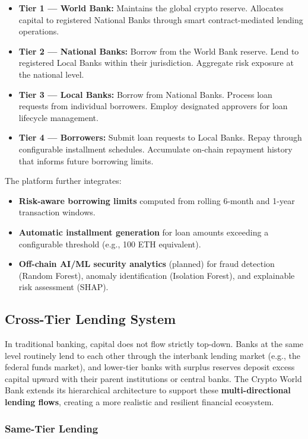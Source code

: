 \documentclass[12pt,a4paper]{report}
\begin{document}
\begin{itemize}[noitemsep]
\item \textbf{Tier 1 --- World Bank:} Maintains the global crypto reserve. Allocates capital to registered National Banks through smart contract-mediated lending operations.
\item \textbf{Tier 2 --- National Banks:} Borrow from the World Bank reserve. Lend to registered Local Banks within their jurisdiction. Aggregate risk exposure at the national level.
\item \textbf{Tier 3 --- Local Banks:} Borrow from National Banks. Process loan requests from individual borrowers. Employ designated approvers for loan lifecycle management.
\item \textbf{Tier 4 --- Borrowers:} Submit loan requests to Local Banks. Repay through configurable installment schedules. Accumulate on-chain repayment history that informs future borrowing limits.
\end{itemize}

The platform further integrates:

\begin{itemize}[noitemsep]
\item \textbf{Risk-aware borrowing limits} computed from rolling 6-month and 1-year transaction windows.
\item \textbf{Automatic installment generation} for loan amounts exceeding a configurable threshold (e.g., 100 ETH equivalent).
\item \textbf{Off-chain AI/ML security analytics} (planned) for fraud detection (Random Forest), anomaly identification (Isolation Forest), and explainable risk assessment (SHAP).
\end{itemize}

\subsection{Cross-Tier Lending System}

In traditional banking, capital does not flow strictly top-down. Banks at the same level routinely lend to each other through the interbank lending market (e.g., the federal funds market), and lower-tier banks with surplus reserves deposit excess capital upward with their parent institutions or central banks. The Crypto World Bank extends its hierarchical architecture to support these \textbf{multi-directional lending flows}, creating a more realistic and resilient financial ecosystem.

\subsubsection{Same-Tier Lending}
\end{document}

